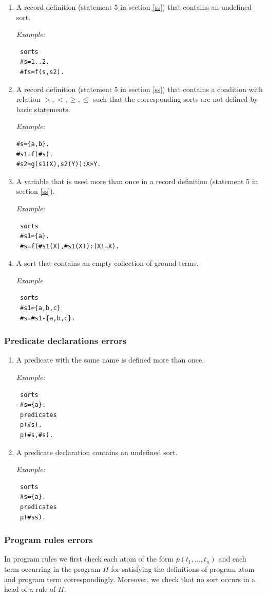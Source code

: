 \documentclass[12pt, letterpaper]{article}
\begin{document}
\begin{enumerate}
\item A record definition (statement 5 in section \ref{ss}) that contains an undefined sort.

\textit{Example:}
\begin{verbatim}
 sorts
 #s=1..2.
 #fs=f(s,s2).
\end{verbatim}



\item A record definition  (statement 5 in section \ref{ss}) that contains a condition with relation $>,<,\geq,\leq$ such that the
   corresponding sorts are not defined by  basic statements.

\textit{Example:}
\begin{verbatim}
#s={a,b}.
#s1=f(#s). 
#s2=g(s1(X),s2(Y)):X>Y.
\end{verbatim}

\item  A variable that is used more than once in a record definition (statement  5 in section \ref{ss}).

\textit{Example:}

\begin{verbatim}
 sorts
 #s1={a}.
 #s=f(#s1(X),#s1(X)):(X!=X).
\end{verbatim}
\item A sort that contains an empty collection of ground terms.

\textit{Example}
\begin{verbatim}
 sorts
 #s1={a,b,c}
 #s=#s1-{a,b,c}.
\end{verbatim}
\end{enumerate}
\subsubsection{Predicate declarations errors}

\begin{enumerate}
\item A predicate with the same name is defined more than once.

\textit{Example:}
\begin{verbatim}
 sorts
 #s={a}.
 predicates
 p(#s).
 p(#s,#s).
\end{verbatim}
\item A predicate declaration contains an undefined sort.

\textit{Example:}
\begin{verbatim}
 sorts
 #s={a}.
 predicates
 p(#ss).
\end{verbatim}
\end{enumerate}
\subsubsection{Program rules errors}

In program rules we first check each atom of the form $p(t_1,\dots,t_n)$ and each term occurring in the program $\Pi$ for satisfying
the definitions of program atom and program term correspondingly\cite{sparc}. Moreover, we check that no sort occurs in a head of a rule of $\Pi$.



\end{document}
